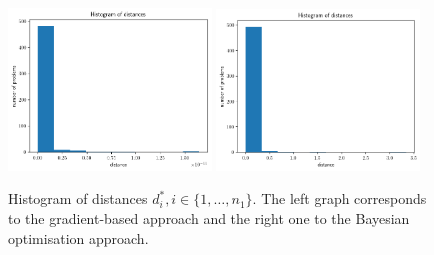 \begin{figure}[ht]
    \begin{center}
      \includegraphics[width=0.48\textwidth]{./Thesis/images/chapter4/ex2D_distance_hist.png}
      \includegraphics[width=0.48\textwidth]{./Thesis/images/chapter4/ex2D_distance_hist_bo.png}
    \end{center}
    \caption[2D example, histogram of distances]{Histogram of distances $d_i^*, i \in \{1, \ldots,
      n_1\}$. The left graph corresponds to the gradient-based
      approach and the right one to the Bayesian optimisation
      approach.}
  \label{fig:ex2_1}
\end{figure}


